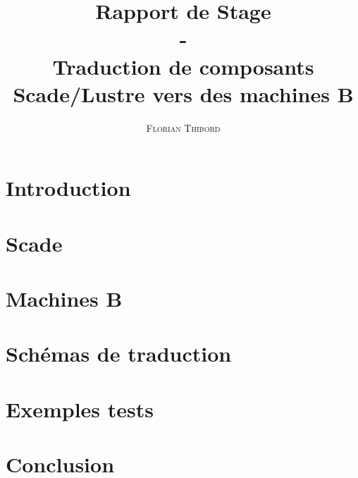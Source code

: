 \documentclass[11pt]{report}
\title{Rapport de Stage \\ - \\ Traduction de composants Scade/Lustre vers des
  machines B}
\author{\textsc{Florian Thibord}}
\begin{document}
\maketitle
\clearpage

\tableofcontents 










 \newpage

\chapter{Introduction}


\chapter{Scade}


\chapter {Machines B}


\chapter{Schémas de traduction}


\chapter{Exemples tests}


\chapter{Conclusion}

\end{document}
